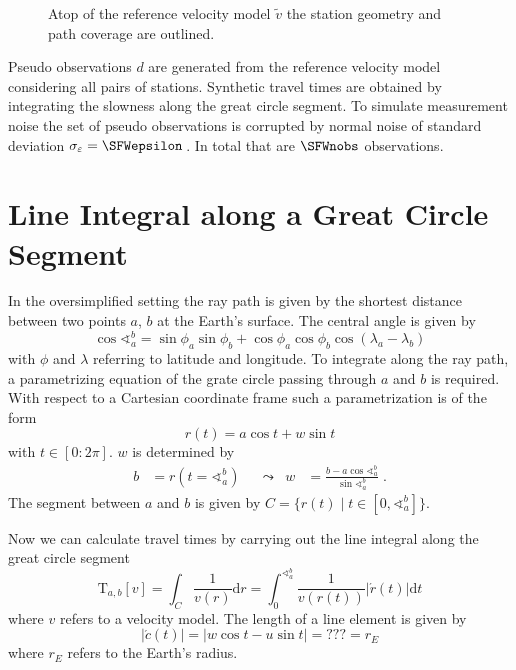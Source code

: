 \documentclass[11pt]{article}
\begin{document}
\begin{figure}
    \centering
    
    \caption{Atop of the reference velocity model $\tilde v$ the station geometry and path coverage are outlined. }
    \label{fig:path_coverage}
\end{figure}

Pseudo observations $d$ are generated from the reference velocity model considering all pairs of stations.
Synthetic travel times are obtained by integrating the slowness along the great circle segment.
To simulate measurement noise the set of pseudo observations is corrupted by normal noise of standard deviation $\sigma_\varepsilon = \SFWepsilon$\,.
In total that are $\SFWnobs$ observations.


\section{Line Integral along a Great Circle Segment}

In the oversimplified setting the ray path is given by the shortest distance between two points $a$, $b$ at the Earth's surface.
The central angle is given by
\begin{equation}
    \cos \sphericalangle_a^b %
    = \sin\phi_a\sin\phi_b + \cos\phi_a\cos\phi_b \cos(\lambda_a - \lambda_b)
\end{equation}
with $\phi$ and $\lambda$ referring to latitude and longitude.
To integrate along the ray path, a parametrizing equation of the grate circle passing through $a$ and $b$ is required.
With respect to a Cartesian coordinate frame such a parametrization is of the form
\begin{equation}
    r(t) = a \cos t + w \sin t
\end{equation}
with $t \in [0:2\pi]$.
$w$ is determined by
\begin{align}
    b &= r(t = \sphericalangle_a^b) &
    &\leadsto &
    w &= \frac{b - a \cos \sphericalangle_a^b}{\sin \sphericalangle_a^b}
    \; .
\end{align}
The segment between $a$ and $b$ is given by $C= \{r(t) \mid t \in [0, \sphericalangle_a^b]\}$.

Now we can calculate travel times by carrying out the line integral along the great circle segment
\begin{equation}
    \mathrm T_{a,b}[v]
    = \int_C \frac1{v(r)} \mathrm d r
    = \int_0^{\sphericalangle_a^b} \frac 1{v(r(t))} |\acute r(t)| \mathrm d t
\end{equation}
where $v$ refers to a velocity model.
The length of a line element is given by
\begin{equation}
    |\acute c(t)| = |w \cos t - u \sin t| = ??? = r_E
\end{equation}
where $r_E$ refers to the Earth's radius.
\end{document}

